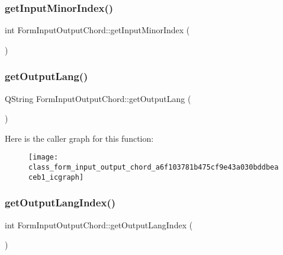 \mbox{\label{class_form_input_output_chord_a2a46ade350a9815d4eeda1c086e4d6e7}} 
\subsubsection{get\+Input\+Minor\+Index()}
{\footnotesize\ttfamily int Form\+Input\+Output\+Chord\+::get\+Input\+Minor\+Index (\begin{DoxyParamCaption}{ }\end{DoxyParamCaption})}

\mbox{\label{class_form_input_output_chord_a6f103781b475cf9e43a030bddbeaceb1}} 
\subsubsection{get\+Output\+Lang()}
{\footnotesize\ttfamily Q\+String Form\+Input\+Output\+Chord\+::get\+Output\+Lang (\begin{DoxyParamCaption}{ }\end{DoxyParamCaption})}

Here is the caller graph for this function\+:\nopagebreak
\begin{figure}[H]
\begin{center}
\leavevmode
\texttt{[image: class\_form\_input\_output\_chord\_a6f103781b475cf9e43a030bddbeaceb1\_icgraph]}
\end{center}
\end{figure}
\mbox{\label{class_form_input_output_chord_a75f5a45ee0a85ccaccbce2dba13bcbb3}} 
\subsubsection{get\+Output\+Lang\+Index()}
{\footnotesize\ttfamily int Form\+Input\+Output\+Chord\+::get\+Output\+Lang\+Index (\begin{DoxyParamCaption}{ }\end{DoxyParamCaption})}

